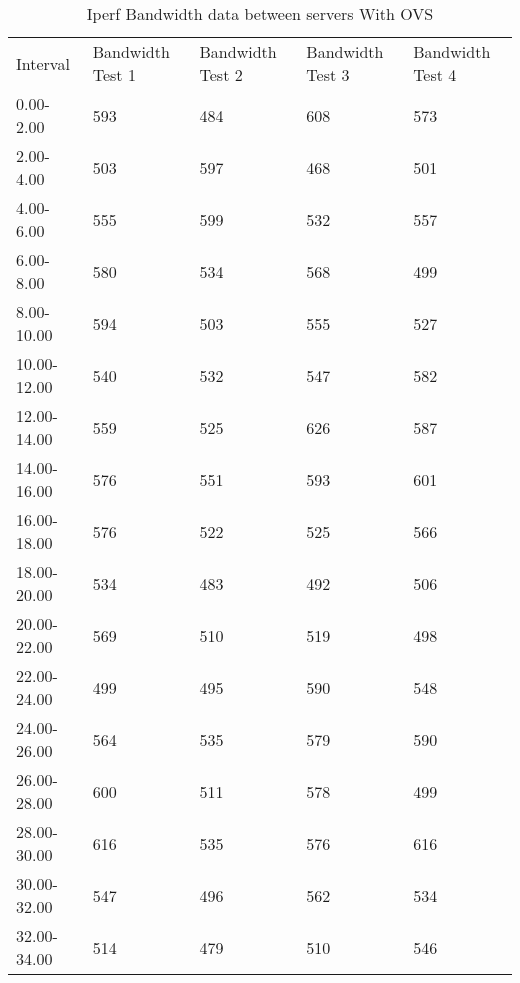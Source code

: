 \begin{table}[]
	\centering
	\caption{Iperf Bandwidth data between servers With OVS}
	\label{tab:iperf_server_server_with_ovs}
	\begin{tabular}{lllll}
		Interval    & Bandwidth Test 1 & Bandwidth Test 2 & Bandwidth Test 3 & Bandwidth Test 4 \\
		0.00-2.00   & 593              & 484              & 608              & 573              \\
		2.00-4.00   & 503              & 597              & 468              & 501              \\
		4.00-6.00   & 555              & 599              & 532              & 557              \\
		6.00-8.00   & 580              & 534              & 568              & 499              \\
		8.00-10.00  & 594              & 503              & 555              & 527              \\
		10.00-12.00 & 540              & 532              & 547              & 582              \\
		12.00-14.00 & 559              & 525              & 626              & 587              \\
		14.00-16.00 & 576              & 551              & 593              & 601              \\
		16.00-18.00 & 576              & 522              & 525              & 566              \\
		18.00-20.00 & 534              & 483              & 492              & 506              \\
		20.00-22.00 & 569              & 510              & 519              & 498              \\
		22.00-24.00 & 499              & 495              & 590              & 548              \\
		24.00-26.00 & 564              & 535              & 579              & 590              \\
		26.00-28.00 & 600              & 511              & 578              & 499              \\
		28.00-30.00 & 616              & 535              & 576              & 616              \\
		30.00-32.00 & 547              & 496              & 562              & 534              \\
		32.00-34.00 & 514              & 479              & 510              & 546              \\

\end{tabular}
\end{table}
